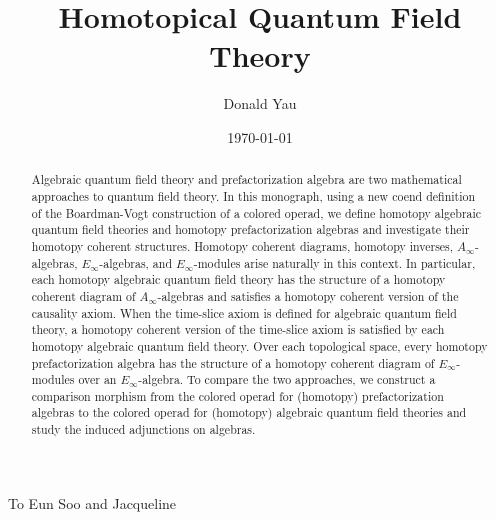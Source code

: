 \documentclass{amsbook}
\numberwithin{section}{chapter}
\numberwithin{subsection}{section}
\numberwithin{equation}{section}
\theoremstyle{plain}
\theoremstyle{definition}
\begin{document}
\title{Homotopical Quantum Field Theory}

\author{Donald Yau}
\address{Department of Mathematics\\
	 The Ohio State University at Newark\\
	 1179 University Drive\\ 
	 Newark, OH 43055, USA}


\begin{abstract}
Algebraic quantum field theory and prefactorization algebra are two mathematical approaches to quantum field theory.  In this monograph, using a new coend definition of the Boardman-Vogt construction of a colored operad, we define homotopy algebraic quantum field theories and homotopy prefactorization algebras and investigate their homotopy coherent structures.  Homotopy coherent diagrams, homotopy inverses, $A_\infty$-algebras, $E_\infty$-algebras, and $E_\infty$-modules arise naturally in this context.  In particular, each homotopy algebraic quantum field theory has the structure of a homotopy coherent diagram of $A_\infty$-algebras and satisfies a homotopy coherent version of the causality axiom.  When the time-slice axiom is defined for algebraic quantum field theory, a homotopy coherent version of the time-slice axiom is satisfied by each homotopy algebraic quantum field theory.  Over each topological space, every homotopy prefactorization algebra has the structure of a homotopy coherent diagram of $E_\infty$-modules over an $E_\infty$-algebra.  To compare the two approaches, we construct a comparison morphism from the colored operad for (homotopy) prefactorization algebras to the colored operad for (homotopy) algebraic quantum field theories and study the induced adjunctions on algebras.
\end{abstract}


\date{\today}

\maketitle

\cleardoublepage
\thispagestyle{empty}
\vspace*{13.5pc}
\begin{center}
To Eun Soo and Jacqueline
\end{center}
\cleardoublepage
\end{document}
